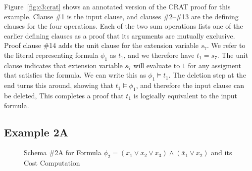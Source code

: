 \documentclass{llncs}
\newcommand{\tautology}{1}
\newcommand{\obar}[1]{\overline{#1}}
\newcommand{\turnstile}{\models}
\begin{document}
Figure~\ref{fig:c3:crat} shows an annotated version of the CRAT proof
for this example.  Clause \#1
is the input clause, and
clauses \#2--\#13 are the defining clauses for the four operations.
Each of the two sum operations lists one of the earlier defining
clauses as a proof that its arguments are mutually exclusive.
Proof clause \#14 adds the unit clause for the extension variable $s_7$.
We refer to the literal representing formula $\phi_1$ as $t_1$,
and we therefore have $t_1 = s_7$.
The unit clause indicates that extension variable $s_7$ will evaluate to
$\tautology$  for any assigment that satisfies the formula.  We
can write this as $\phi_1 \turnstile t_1$.  The
deletion step at the end turns this around, showing that
$t_1 \turnstile \phi_1$,
and therefore the input clause can be deleted, This
completes a proof that $t_1$ is logically
equivalent to the input formula.

\subsection{Example 2A}

\begin{figure}
  \caption{Schema \#2A for Formula $\phi_2 = (x_1 \lor x_2 \lor x_3) \land (\obar{x}_1 \lor x_2)$ and its Cost Computation}
\label{fig:p2-bdd:schema}
\end{figure}
\end{document}
